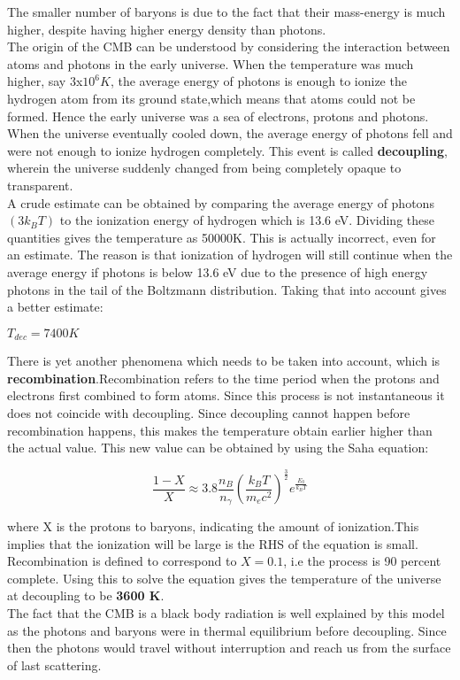 The smaller number of baryons is due to the fact that their mass-energy is much higher, despite having higher energy density than photons.
\\
The origin of the CMB can be understood by considering the interaction between atoms and photons in the early universe. When the temperature was much higher, say $3$x$10^6 K$, the average energy of photons is enough to ionize the hydrogen atom from its ground state,which means that atoms could not be formed. Hence the early universe was a sea of electrons, protons and photons.
When the universe eventually cooled down, the average energy of photons fell and were not enough to ionize hydrogen completely. This event is called \textbf{decoupling}, wherein the universe suddenly changed from being completely opaque to transparent.
\\
A crude estimate can be obtained by comparing the average energy of photons $(3k_{B}T)$ to the ionization energy of hydrogen which is 13.6 eV. Dividing these quantities gives the temperature as 50000K. 
This is actually incorrect, even for an estimate. The reason is that ionization of hydrogen will still continue when the average energy if photons is below 13.6 eV due to the presence of high energy photons in the tail of the Boltzmann distribution. Taking that into account gives a better estimate:

\begin{center}
    $T_{dec} = 7400 K$
\end{center}

There is yet another phenomena which needs to be taken into account, which is \textbf{recombination}.Recombination refers to the time period when the protons and electrons first combined to form atoms. Since this process is not instantaneous it does not coincide with decoupling. Since decoupling cannot happen before recombination happens, this makes the temperature obtain earlier higher than the actual value. This new value can be obtained by using the Saha equation:

\begin{equation}
    \frac{1-X}{X} \approx 3.8\frac{n_B}{n_{\gamma}}(\frac{k_{B}T}{m_{e}c^2})^{\frac{3}{2}}e^{\frac{E_0}{k_{B}T}}
\end{equation}

where X is the protons to baryons, indicating the amount of ionization.This implies that the ionization will be large is the RHS of the equation is small. Recombination is defined to correspond to $X = 0.1$, i.e the process is 90 percent complete. Using this to solve the equation gives the temperature of the universe at decoupling to be \textbf{3600 K}.
\\
The fact that the CMB is a black body radiation is well explained by this model as the photons and baryons were in thermal equilibrium before decoupling. Since then the photons would travel without interruption and reach us from the surface of last scattering.

